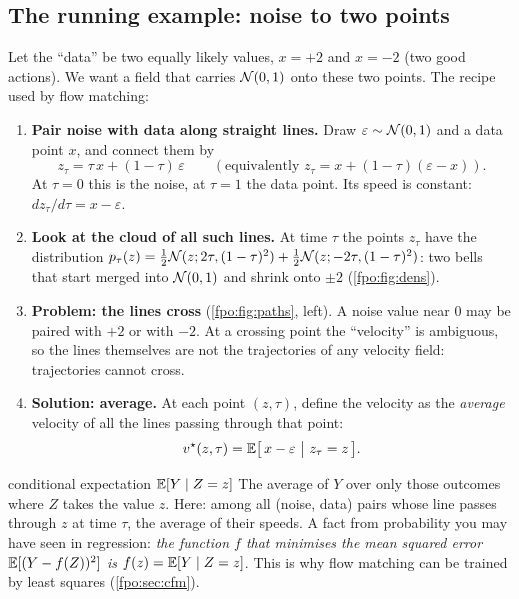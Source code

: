 \subsection{The running example: noise to two points}\label{fpo:sec:twopoint}
Let the ``data'' be two equally likely values, $x=+2$ and $x=-2$ (two good actions). We want a field that carries $\mathcal{N}(0,1)$ onto these two points. The recipe used by flow matching:
\begin{enumerate}
\item \textbf{Pair noise with data along straight lines.} Draw $\varepsilon\sim\mathcal{N}(0,1)$ and a data point $x$, and connect them by
\begin{equation}
z_\tau=\tau\,x+(1-\tau)\,\varepsilon\qquad(\text{equivalently } z_\tau=x+(1-\tau)(\varepsilon-x)).
\label{fpo:eq:interp}
\end{equation}
At $\tau=0$ this is the noise, at $\tau=1$ the data point. Its speed is constant: $dz_\tau/d\tau=x-\varepsilon$.
\item \textbf{Look at the cloud of all such lines.} At time $\tau$ the points $z_\tau$ have the distribution $p_\tau(z)=\tfrac12\mathcal{N}(z;2\tau,(1-\tau)^2)+\tfrac12\mathcal{N}(z;-2\tau,(1-\tau)^2)$: two bells that start merged into $\mathcal{N}(0,1)$ and shrink onto $\pm2$ (\cref{fpo:fig:dens}).
\item \textbf{Problem: the lines cross} (\cref{fpo:fig:paths}, left). A noise value near $0$ may be paired with $+2$ or with $-2$. At a crossing point the ``velocity'' is ambiguous, so the lines themselves are not the trajectories of any velocity field: trajectories cannot cross.
\item \textbf{Solution: average.} At each point $(z,\tau)$, define the velocity as the \emph{average} velocity of all the lines passing through that point:
\begin{equation}
v^\star(z,\tau)=\E\big[\,x-\varepsilon\ \big|\ z_\tau=z\,\big].
\label{fpo:eq:vstar}
\end{equation}
\end{enumerate}
\begin{newc}{conditional expectation $\mathbb{E}[Y\mid Z=z]$}
The average of $Y$ over only those outcomes where $Z$ takes the value $z$. Here: among all (noise, data) pairs whose line passes through $z$ at time $\tau$, the average of their speeds. A fact from probability you may have seen in regression: \emph{the function $f$ that minimises the mean squared error $\mathbb{E}[(Y-f(Z))^2]$ is $f(z)=\mathbb{E}[Y\mid Z=z]$}. This is why flow matching can be trained by least squares (\cref{fpo:sec:cfm}).
\end{newc}
